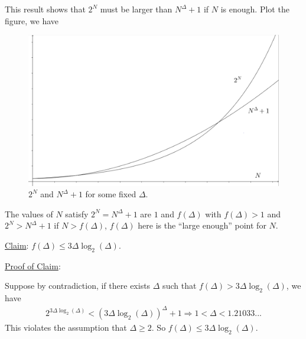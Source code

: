 \documentclass[12pt]{article}
\newcommand{\ParTh}[1]{\left(#1\right)}
\begin{document}
This result shows that $2^N$ must be larger than $N^\Delta+1$ if $N$ is enough. Plot the figure, we have
\begin{figure}[H]
	\centering
	\includegraphics[scale=0.27]{21-4.png}
	\caption{$2^N$ and $N^\Delta+1$ for some fixed $\Delta$.}
\end{figure}
The values of $N$ satisfy $2^N=N^\Delta+1$ are $1$ and $f\ParTh{\Delta}$ with $f\ParTh{\Delta}>1$ and $2^N>N^\Delta+1$ if $N>f\ParTh{\Delta}$, $f\ParTh{\Delta}$ here is the ``large enough'' point for $N$.

\underline{Claim}: $f\ParTh{\Delta}\leq3\Delta\log_2\ParTh{\Delta}$.

\underline{Proof of Claim}:

Suppose by contradiction, if there exists $\Delta$ such that $f\ParTh{\Delta}>3\Delta\log_2\ParTh{\Delta}$, we have
\begin{align}
2^{3\Delta\log_2\ParTh{\Delta}} < \ParTh{3\Delta\log_2\ParTh{\Delta}}^\Delta+1\Rightarrow1<\Delta<1.21033...
\end{align}
This violates the assumption that $\Delta\geq2$. So $f\ParTh{\Delta}\leq3\Delta\log_2\ParTh{\Delta}$.
\end{document}
